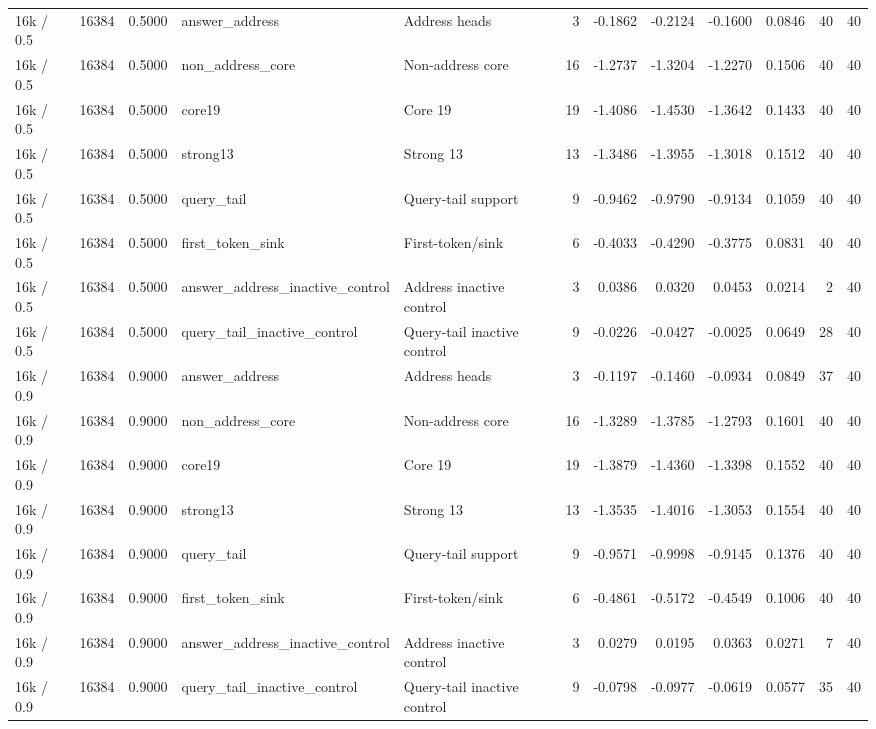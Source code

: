 \begin{tabular}{lrrllrrrrrrr}
16k / 0.5 & 16384 & 0.5000 & answer_address & Address heads & 3 & -0.1862 & -0.2124 & -0.1600 & 0.0846 & 40 & 40 \\
16k / 0.5 & 16384 & 0.5000 & non_address_core & Non-address core & 16 & -1.2737 & -1.3204 & -1.2270 & 0.1506 & 40 & 40 \\
16k / 0.5 & 16384 & 0.5000 & core19 & Core 19 & 19 & -1.4086 & -1.4530 & -1.3642 & 0.1433 & 40 & 40 \\
16k / 0.5 & 16384 & 0.5000 & strong13 & Strong 13 & 13 & -1.3486 & -1.3955 & -1.3018 & 0.1512 & 40 & 40 \\
16k / 0.5 & 16384 & 0.5000 & query_tail & Query-tail support & 9 & -0.9462 & -0.9790 & -0.9134 & 0.1059 & 40 & 40 \\
16k / 0.5 & 16384 & 0.5000 & first_token_sink & First-token/sink & 6 & -0.4033 & -0.4290 & -0.3775 & 0.0831 & 40 & 40 \\
16k / 0.5 & 16384 & 0.5000 & answer_address_inactive_control & Address inactive control & 3 & 0.0386 & 0.0320 & 0.0453 & 0.0214 & 2 & 40 \\
16k / 0.5 & 16384 & 0.5000 & query_tail_inactive_control & Query-tail inactive control & 9 & -0.0226 & -0.0427 & -0.0025 & 0.0649 & 28 & 40 \\
16k / 0.9 & 16384 & 0.9000 & answer_address & Address heads & 3 & -0.1197 & -0.1460 & -0.0934 & 0.0849 & 37 & 40 \\
16k / 0.9 & 16384 & 0.9000 & non_address_core & Non-address core & 16 & -1.3289 & -1.3785 & -1.2793 & 0.1601 & 40 & 40 \\
16k / 0.9 & 16384 & 0.9000 & core19 & Core 19 & 19 & -1.3879 & -1.4360 & -1.3398 & 0.1552 & 40 & 40 \\
16k / 0.9 & 16384 & 0.9000 & strong13 & Strong 13 & 13 & -1.3535 & -1.4016 & -1.3053 & 0.1554 & 40 & 40 \\
16k / 0.9 & 16384 & 0.9000 & query_tail & Query-tail support & 9 & -0.9571 & -0.9998 & -0.9145 & 0.1376 & 40 & 40 \\
16k / 0.9 & 16384 & 0.9000 & first_token_sink & First-token/sink & 6 & -0.4861 & -0.5172 & -0.4549 & 0.1006 & 40 & 40 \\
16k / 0.9 & 16384 & 0.9000 & answer_address_inactive_control & Address inactive control & 3 & 0.0279 & 0.0195 & 0.0363 & 0.0271 & 7 & 40 \\
16k / 0.9 & 16384 & 0.9000 & query_tail_inactive_control & Query-tail inactive control & 9 & -0.0798 & -0.0977 & -0.0619 & 0.0577 & 35 & 40 \\
\bottomrule
\end{tabular}
